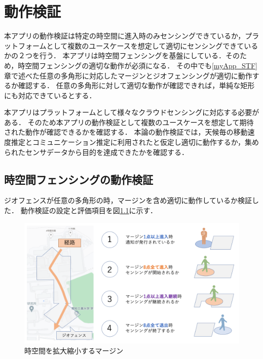 \chapter{動作検証}
\thispagestyle{myheadings}
本アプリの動作検証は特定の時空間に進入時のみセンシングできているか，プラットフォームとして複数のユースケースを想定して適切にセンシングできているかの２つを行う．
本アプリは時空間フェンシングを基盤にしている．そのため，時空間フェンシングの適切な動作が必須になる．
その中でも\ref{myApp_STF}章で述べた任意の多角形に対応したマージンとジオフェンシングが適切に動作するか確認する．
任意の多角形に対して適切な動作が確認できれば，単純な矩形にも対応できているとする．

本アプリはプラットフォームとして様々なクラウドセンシングに対応する必要がある．
そのため本アプリの動作検証として複数のユースケースを想定して期待された動作が確認できるかを確認する．
本論の動作検証では，天候毎の移動速度推定とコミュニケーション推定に利用されたと仮定し適切に動作するか，集められたセンサデータから目的を達成できたかを確認する．

\section{時空間フェンシングの動作検証}
ジオフェンスが任意の多角形の時，マージンを含め適切に動作しているか検証した．
動作検証の設定と評価項目を図\ref{fig:ex_margin_1}に示す．

\begin{figure}[tbh]
    \centering
    \includegraphics[width=16cm]{img_ex_margin_1.png}
    \caption{時空間を拡大縮小するマージン}
    \label{fig:ex_margin_1}
\end{figure}


